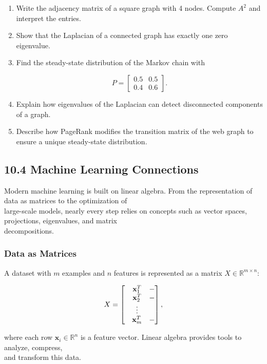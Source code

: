 \documentclass[
  12pt,
  a4paper,
]{article}
\begin{document}
\begin{enumerate}
\def\labelenumi{\arabic{enumi}.}
\item
  Write the adjacency matrix of a square graph with 4 nodes. Compute
  \(A^2\) and interpret the entries.
\item
  Show that the Laplacian of a connected graph has exactly one zero
  eigenvalue.
\item
  Find the steady-state distribution of the Markov chain with

  \[P = \begin{bmatrix} 0.5 & 0.5 \\ 0.4 & 0.6 \end{bmatrix}.\]
\item
  Explain how eigenvalues of the Laplacian can detect disconnected
  components of a graph.
\item
  Describe how PageRank modifies the transition matrix of the web graph
  to ensure a unique steady-state distribution.
\end{enumerate}

\subsection{10.4 Machine Learning
Connections}\label{104-machine-learning-connections}

Modern machine learning is built on linear algebra. From the
representation of data as matrices to the optimization of\\
large-scale models, nearly every step relies on concepts such as vector
spaces, projections, eigenvalues, and matrix\\
decompositions.

\subsubsection{Data as Matrices}\label{data-as-matrices}

A dataset with \(m\) examples and \(n\) features is represented as a
matrix \(X \in \mathbb{R}^{m \times n}\):

\[X =
\begin{bmatrix}
\- & \mathbf{x}_1^T & - \\
\- & \mathbf{x}_2^T & - \\
  & \vdots & \\
\- & \mathbf{x}_m^T & -
\end{bmatrix},\]

where each row \(\mathbf{x}_i \in \mathbb{R}^n\) is a feature vector.
Linear algebra provides tools to analyze, compress,\\
and transform this data.
\end{document}
